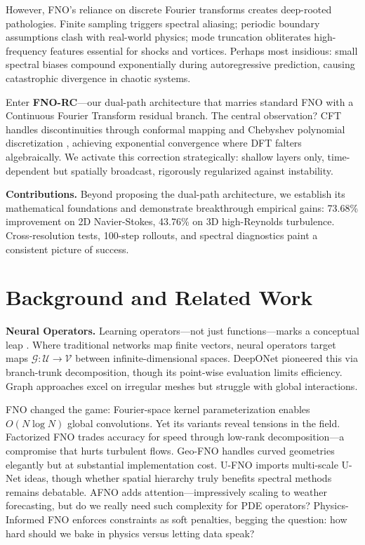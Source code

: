 \documentclass[11pt]{article}
\newcommand{\G}{\mathcal{G}}
\begin{document}
However, FNO's reliance on discrete Fourier transforms creates deep-rooted pathologies. Finite sampling triggers spectral aliasing; periodic boundary assumptions clash with real-world physics; mode truncation obliterates high-frequency features essential for shocks and vortices. Perhaps most insidious: small spectral biases compound exponentially during autoregressive prediction, causing catastrophic divergence in chaotic systems.

Enter \textbf{FNO-RC}—our dual-path architecture that marries standard FNO with a Continuous Fourier Transform residual branch. The central observation? CFT handles discontinuities through conformal mapping and Chebyshev polynomial discretization \citep{barnett2010conformal}, achieving exponential convergence where DFT falters algebraically. We activate this correction strategically: shallow layers only, time-dependent but spatially broadcast, rigorously regularized against instability.

\textbf{Contributions.} Beyond proposing the dual-path architecture, we establish its mathematical foundations and demonstrate breakthrough empirical gains: 73.68\% improvement on 2D Navier-Stokes, 43.76\% on 3D high-Reynolds turbulence. Cross-resolution tests, 100-step rollouts, and spectral diagnostics paint a consistent picture of success.

\section{Background and Related Work}

\textbf{Neural Operators.} Learning operators—not just functions—marks a conceptual leap \citep{kovachki2021neural,azizzadenesheli2024neural}. Where traditional networks map finite vectors, neural operators target maps $\G: \mathcal{U} \rightarrow \mathcal{V}$ between infinite-dimensional spaces. DeepONet \citep{lu2021learning,wang2021learning} pioneered this via branch-trunk decomposition, though its point-wise evaluation limits efficiency. Graph approaches \citep{li2020multipole,li2020neural} excel on irregular meshes but struggle with global interactions.

FNO \citep{Li2020FNO} changed the game: Fourier-space kernel parameterization enables $O(N \log N)$ global convolutions. Yet its variants reveal tensions in the field. Factorized FNO \citep{tran2021factorized} trades accuracy for speed through low-rank decomposition—a compromise that hurts turbulent flows. Geo-FNO \citep{li2023geometry} handles curved geometries elegantly but at substantial implementation cost. U-FNO \citep{wen2022u} imports multi-scale U-Net ideas, though whether spatial hierarchy truly benefits spectral methods remains debatable. AFNO \citep{guibas2021adaptive,pathak2022fourcastnet} adds attention—impressively scaling to weather forecasting, but do we really need such complexity for PDE operators? Physics-Informed FNO \citep{li2021physics} enforces constraints as soft penalties, begging the question: how hard should we bake in physics versus letting data speak?
\end{document}
